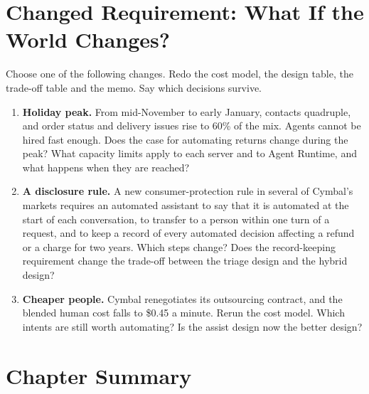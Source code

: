 \section{Changed Requirement: What If the World Changes?}
\label{sec:support-changed}

Choose one of the following changes. Redo the cost model, the design table, the trade-off table and the memo. Say which decisions survive.

\begin{enumerate}[itemsep=3pt]
  \item \textbf{Holiday peak.} From mid-November to early January, contacts quadruple, and order status and delivery issues rise to 60\% of the mix. Agents cannot be hired fast enough. Does the case for automating returns change during the peak? What capacity limits apply to each server and to Agent Runtime, and what happens when they are reached?
  \item \textbf{A disclosure rule.} A new consumer-protection rule in several of Cymbal's markets requires an automated assistant to say that it is automated at the start of each conversation, to transfer to a person within one turn of a request, and to keep a record of every automated decision affecting a refund or a charge for two years. Which steps change? Does the record-keeping requirement change the trade-off between the triage design and the hybrid design?
  \item \textbf{Cheaper people.} Cymbal renegotiates its outsourcing contract, and the blended human cost falls to \$0.45 a minute. Rerun the cost model. Which intents are still worth automating? Is the assist design now the better design?
\end{enumerate}

\section*{Chapter Summary}


